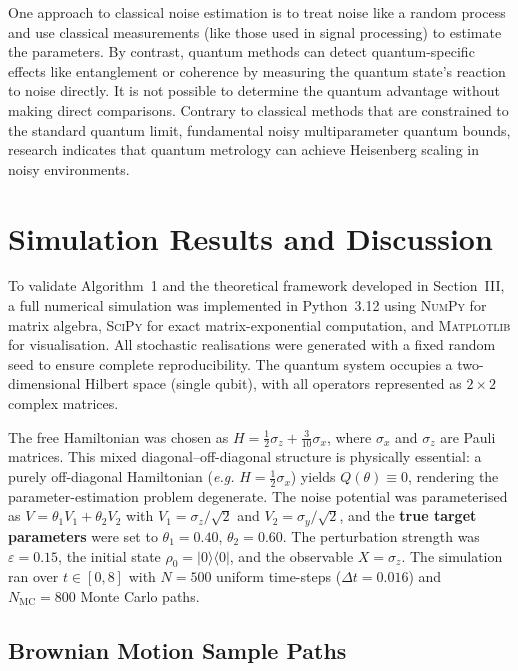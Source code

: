 \documentclass[journal,twocolumn]{IEEEtran}
\begin{document}
One approach to classical noise estimation is to treat noise like a random process and use classical measurements (like those used in signal processing) to estimate the parameters. By contrast, quantum methods can detect quantum-specific effects like entanglement or coherence by measuring the quantum state's reaction to noise directly. It is not possible to determine the quantum advantage without making direct comparisons. Contrary to classical methods that are constrained to the standard quantum limit, fundamental noisy multiparameter quantum bounds, research indicates that quantum metrology can achieve Heisenberg scaling in noisy environments.
\vspace{-2\baselineskip}
\section{Simulation Results and Discussion}
\label{sec:simulation}

To validate Algorithm~1 and the theoretical framework developed in
Section~III, a full numerical simulation was implemented in Python~3.12
using \textsc{NumPy} for matrix algebra, \textsc{SciPy} for exact
matrix-exponential computation, and \textsc{Matplotlib} for
visualisation. All stochastic realisations were generated with a fixed
random seed to ensure complete reproducibility. The quantum system
occupies a two-dimensional Hilbert space (single qubit), with all
operators represented as $2\times 2$ complex matrices.

The free Hamiltonian was chosen as $H = \tfrac{1}{2}\sigma_z +
\tfrac{3}{10}\sigma_x$, where $\sigma_x$ and $\sigma_z$ are Pauli
matrices. This mixed diagonal–off-diagonal structure is physically
essential: a purely off-diagonal Hamiltonian (\textit{e.g.}
$H=\tfrac{1}{2}\sigma_x$) yields $Q(\theta)\equiv 0$, rendering the
parameter-estimation problem degenerate. The noise potential was
parameterised as $V = \theta_1 V_1 + \theta_2 V_2$ with
$V_1 = \sigma_z/\sqrt{2}$ and $V_2 = \sigma_y/\sqrt{2}$, and the
\textbf{true target parameters} were set to $\theta_1 = 0.40$,
$\theta_2 = 0.60$. The perturbation strength was $\varepsilon = 0.15$,
the initial state $\rho_0 = |0\rangle\langle 0|$, and the observable
$X = \sigma_z$. The simulation ran over $t\in[0,8]$ with $N = 500$
uniform time-steps ($\Delta t = 0.016$) and $N_{\mathrm{MC}} = 800$
Monte Carlo paths.

\subsection{Brownian Motion Sample Paths}
\end{document}
